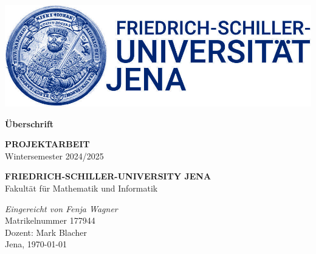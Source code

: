\documentclass[12pt]{scrbook}
\begin{document}
\begin{titlepage}
    \begin{center}

        \begin{spacing}{1.5}
            \includegraphics[scale=0.25]{images/Bildmarke_blue_8cm.jpg}
            \vspace*{\fill}
        \end{spacing}
        \begin{spacing}{2.5}
            \textbf{\huge Überschrift}\\[0.5cm]
            \vspace*{\fill}
            \begin{spacing}{1.5}
                \textbf{PROJEKTARBEIT\\}
                Wintersemester 2024/2025
            \end{spacing}
        \end{spacing}

        \vspace*{\fill}

        \begin{spacing}{1.15}
            \textbf{FRIEDRICH-SCHILLER-UNIVERSITY JENA\\}
            Fakultät für Mathematik und Informatik

            \vspace*{\fill}

            \textit{Eingereicht von Fenja Wagner}\\
            Matrikelnummer 177944\\
            Dozent: Mark Blacher\\
            Jena, \today

        \end{spacing}
    \end{center}
\end{titlepage}

%
%
%
%
%
%
\end{document}
